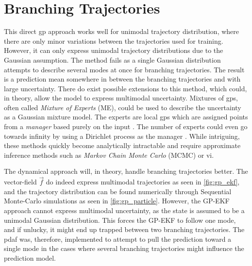 \section{Branching Trajectories}
This direct \acrshort{gp} approach works well for unimodal trajectory distribution, where there are only minor variations between the trajectories used for training. However, it can only express unimodal trajectory distributions due to the Gaussian assumption. The method fails as a single Gaussian distribution attempts to describe several modes at once for branching trajectories. The result is a prediction mean somewhere in between the branching trajectories and with large uncertainty. There do exist possible extensions to this method, which could, in theory, allow the model to express multimodal uncertainty. Mixtures of \acrshort{gp}s, often called \textit{Mixture of Experts} (ME), could be used to describe the uncertainty as a Gaussian mixture model. The experts are local \acrshort{gp}s which are assigned points from a \textit{manager} based purely on the input \cite{rasmussen}. The number of experts could even go towards infinity by using a Dirichlet process as the manager \cite{dirichlet_process_gp}. While intriguing, these methods quickly become analytically intractable and require approximate inference methods such as \textit{Markov Chain Monte Carlo} (MCMC) or \acrshort{vi}. 

The dynamical approach will, in theory, handle branching trajectories better. The vector-field $\vec{f}$ do indeed express multimodal trajectories as seen in \cref{fig:gp_ekf}, and the trajectory distribution can be found numerically through Sequential Monte-Carlo simulations as seen in \cref{fig:gp_particle}. However, the GP-EKF approach cannot express multimodal uncertainty, as the state is assumed to be a unimodal Gaussian distribution. This forces the GP-EKF to follow one mode, and if unlucky, it might end up trapped between two branching trajectories. The \acrshort{pdaf} was, therefore, implemented to attempt to pull the prediction toward a single mode in the cases where several branching trajectories might influence the prediction model. 

